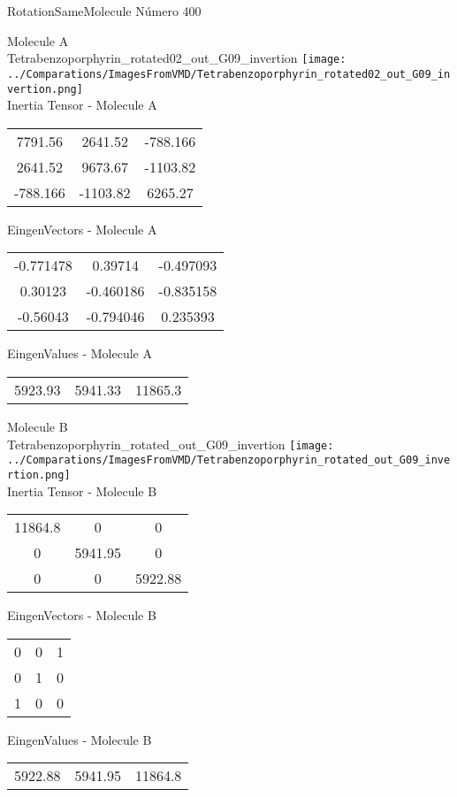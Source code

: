 \vtab[-2cm]
\begin{center}
{\large RotationSameMolecule \tab Número 400}
\end{center}
\begin{multicols}{2}
\begin{center}

Molecule A \\ 
Tetrabenzoporphyrin\_rotated02\_out\_G09\_invertion
\texttt{[image: ../Comparations/ImagesFromVMD/Tetrabenzoporphyrin\_rotated02\_out\_G09\_invertion.png]}
\\
Inertia Tensor - Molecule A \\
\vtab

\begin{tabular}{|c c c|}
7791.56	 & 	2641.52	 & 	-788.166	 \\
2641.52	 & 	9673.67	 & 	-1103.82	 \\
-788.166	 & 	-1103.82	 & 	6265.27
\end{tabular}

\vtab
 EingenVectors - Molecule A     \\
\vtab
\begin{tabular}{|c c c|}
-0.771478	 & 	0.39714	 & 	-0.497093	 \\
0.30123	 & 	-0.460186	 & 	-0.835158	 \\
-0.56043	 & 	-0.794046	 & 	0.235393
\end{tabular}

\vtab
 EingenValues - Molecule A     \\
\vtab
\begin{tabular}{|c c c|}
5923.93	 & 	5941.33	 & 	11865.3	 \\
\end{tabular}
\columnbreak

Molecule B \\ 
Tetrabenzoporphyrin\_rotated\_out\_G09\_invertion
\texttt{[image: ../Comparations/ImagesFromVMD/Tetrabenzoporphyrin\_rotated\_out\_G09\_invertion.png]}
\\
Inertia Tensor - Molecule B \\
\vtab

\begin{tabular}{|c c c|}
11864.8	 & 	0	 & 	0	 \\
0	 & 	5941.95	 & 	0	 \\
0	 & 	0	 & 	5922.88
\end{tabular}

\vtab
 EingenVectors - Molecule B     \\
\vtab
\begin{tabular}{|c c c|}
0	 & 	0	 & 	1	 \\
0	 & 	1	 & 	0	 \\
1	 & 	0	 & 	0
\end{tabular}

\vtab
 EingenValues - Molecule B     \\
\vtab
\begin{tabular}{|c c c|}
5922.88	 & 	5941.95	 & 	11864.8	 \\
\end{tabular}

\end{center}
\end{multicols}
